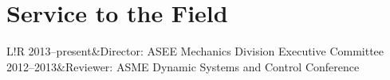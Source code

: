 \documentclass[10pt]{article}
\newcommand\VRule{\color{lightgray}\vrule width 0.5pt}
\begin{document}


\section*{Service to the Field}
\begin{tabular}{L!{\VRule}R}
2013--present&Director: ASEE Mechanics Division Executive Committee\\
2012--2013&Reviewer: ASME Dynamic Systems and Control Conference\\
\end{tabular}


\end{document}
